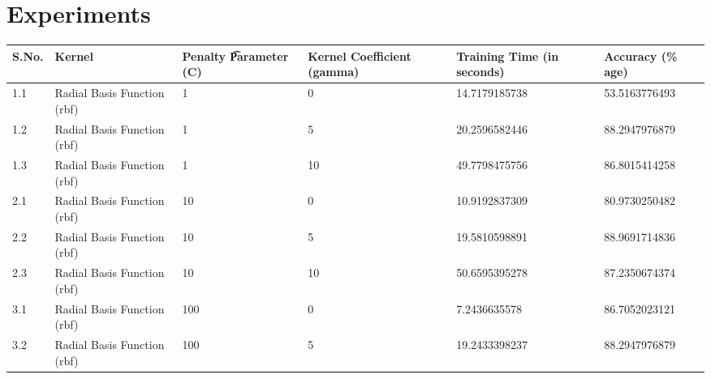 \documentclass{report}
\begin{document}
\section{\Huge Experiments}
\hspace*{-1cm}
\begin{table}[!h]
\centering
\begin{tabular}{|p{0.7cm}|p{4.1cm}|p{2.4cm}|p{2cm}|p{2.5cm}|p{2.5cm}|}
\hline
\textbf{S.No.} & \textbf{Kernel}             & \textbf{Penalty \t Parameter (C)} & \textbf{Kernel \linebreak Coefficient (gamma)} & \textbf{Training Time (in seconds)} & \textbf{Accuracy \linebreak (\% age)} \\ \hline
1.1            & Radial Basis Function (rbf) & 1                               & 0                                   & 14.7179185738                       & 53.5163776493              \\ \hline
1.2            & Radial Basis Function (rbf) & 1                               & 5                                   & 20.2596582446                       & 88.2947976879              \\ \hline
1.3            & Radial Basis Function (rbf) & 1                               & 10                                  & 49.7798475756                       & 86.8015414258              \\ \hline
2.1            & Radial Basis Function (rbf) & 10                              & 0                                   & 10.9192837309                       & 80.9730250482              \\ \hline
2.2            & Radial Basis Function (rbf) & 10                              & 5                                   & 19.5810598891                       & 88.9691714836              \\ \hline
2.3            & Radial Basis Function (rbf) & 10                              & 10                                  & 50.6595395278                       & 87.2350674374              \\ \hline
3.1            & Radial Basis Function (rbf) & 100                             & 0                                   & 7.2436635578                        & 86.7052023121              \\ \hline
3.2            & Radial Basis Function (rbf) & 100                             & 5                                   & 19.2433398237                       & 88.2947976879              \\ \hline

\end{tabular}
\end{table}
\end{document}
